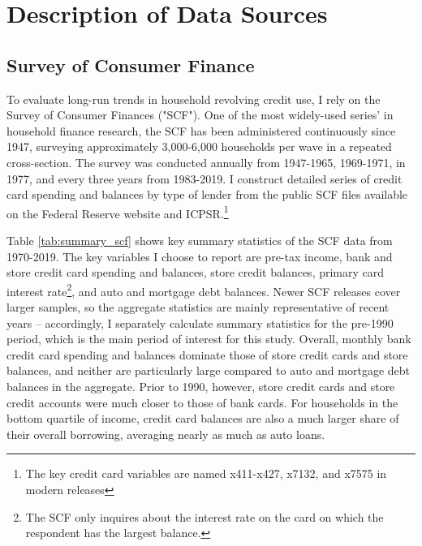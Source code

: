 \documentclass[12pt,english]{article}
\begin{document}
\newpage
\singlespace

\newpage


\appendix
\setcounter{table}{0}
\renewcommand{\thetable}{A\arabic{table}}
\setcounter{figure}{0}
\renewcommand{\thefigure}{A\arabic{figure}}

\begin{centering}


\end{centering}

\section{Description of Data Sources}\label{sec:data}

\subsection{Survey of Consumer Finance}

To evaluate long-run trends in household revolving credit use, I rely on the Survey of Consumer Finances ("SCF"). One of the most widely-used series' in household finance research, the SCF has been administered continuously since 1947, surveying approximately 3,000-6,000 households per wave in a repeated cross-section. The survey was conducted annually from 1947-1965, 1969-1971, in 1977, and every three years from 1983-2019. I construct detailed series of credit card spending and balances by type of lender from the public SCF files available on the Federal Reserve website and ICPSR.\footnote{The key credit card variables are named x411-x427, x7132, and x7575 in modern releases} 

Table \ref{tab:summary_scf} shows key summary statistics of the SCF data from 1970-2019. The key variables I choose to report are pre-tax income, bank and store credit card spending and balances, store credit balances, primary card interest rate\footnote{The SCF only inquires about the interest rate on the card on which the respondent has the largest balance.}, and auto and mortgage debt balances. Newer SCF releases cover larger samples, so the aggregate statistics are mainly representative of recent years -- accordingly, I separately calculate summary statistics for the pre-1990 period, which is the main period of interest for this study. Overall, monthly bank credit card spending and balances dominate those of store credit cards and store balances, and neither are particularly large compared to auto and mortgage debt balances in the aggregate. Prior to 1990, however, store credit cards and store credit accounts were much closer to those of bank cards. For households in the bottom quartile of income, credit card balances are also a much larger share of their overall borrowing, averaging nearly as much as auto loans. 
\end{document}
